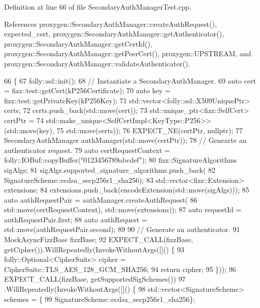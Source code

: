 Definition at line 66 of file Secondary\+Auth\+Manager\+Test.\+cpp.



References proxygen\+::\+Secondary\+Auth\+Manager\+::create\+Auth\+Request(), expected\+\_\+cert, proxygen\+::\+Secondary\+Auth\+Manager\+::get\+Authenticator(), proxygen\+::\+Secondary\+Auth\+Manager\+::get\+Cert\+Id(), proxygen\+::\+Secondary\+Auth\+Manager\+::get\+Peer\+Cert(), proxygen\+::\+U\+P\+S\+T\+R\+E\+AM, and proxygen\+::\+Secondary\+Auth\+Manager\+::validate\+Authenticator().


\begin{DoxyCode}
66                                               \{
67   folly::ssl::init();
68   \textcolor{comment}{// Instantiate a SecondaryAuthManager.}
69   \textcolor{keyword}{auto} cert = fizz::test::getCert(kP256Certificate);
70   \textcolor{keyword}{auto} key = fizz::test::getPrivateKey(kP256Key);
71   std::vector<folly::ssl::X509UniquePtr> certs;
72   certs.push\_back(std::move(cert));
73   std::unique\_ptr<fizz::SelfCert> certPtr =
74       std::make\_unique<SelfCertImpl<KeyType::P256>>(std::move(key),
75                                                     std::move(certs));
76   EXPECT\_NE(certPtr, \textcolor{keyword}{nullptr});
77   SecondaryAuthManager authManager(std::move(certPtr));
78   \textcolor{comment}{// Genearte an authenticator request.}
79   \textcolor{keyword}{auto} certRequestContext = folly::IOBuf::copyBuffer(\textcolor{stringliteral}{"0123456789abcdef"});
80   fizz::SignatureAlgorithms sigAlgs;
81   sigAlgs.supported\_signature\_algorithms.push\_back(
82       SignatureScheme::ecdsa\_secp256r1\_sha256);
83   std::vector<fizz::Extension> extensions;
84   extensions.push\_back(encodeExtension(std::move(sigAlgs)));
85   \textcolor{keyword}{auto} authRequestPair = authManager.createAuthRequest(
86       std::move(certRequestContext), std::move(extensions));
87   \textcolor{keyword}{auto} requestId = authRequestPair.first;
88   \textcolor{keyword}{auto} authRequest = std::move(authRequestPair.second);
89 
90   \textcolor{comment}{// Generate an authenticator.}
91   MockAsyncFizzBase fizzBase;
92   EXPECT\_CALL(fizzBase, getCipher()).WillRepeatedly(InvokeWithoutArgs([]() \{
93     folly::Optional<CipherSuite> cipher = CipherSuite::TLS\_AES\_128\_GCM\_SHA256;
94     \textcolor{keywordflow}{return} cipher;
95   \}));
96   EXPECT\_CALL(fizzBase, getSupportedSigSchemes())
97       .WillRepeatedly(InvokeWithoutArgs([]() \{
98         std::vector<SignatureScheme> schemes = \{
99             SignatureScheme::ecdsa\_secp256r1\_sha256\};

\end{DoxyCode}
